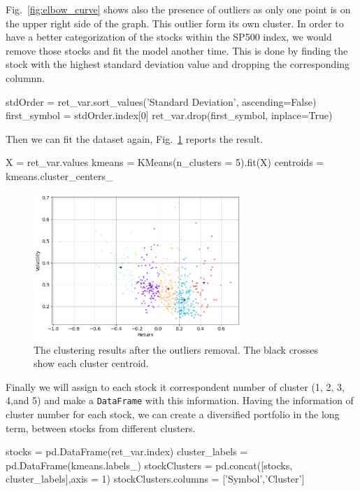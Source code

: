 Fig.~\ref{fig:elbow_curve} shows also the presence of outliers as only one point is on the upper right side of the graph. This outlier form its own cluster. In order to have a better categorization of the stocks within the SP500 index, we would remove those stocks and fit the model another time.
This is done by finding the stock with the highest standard deviation value and dropping the corresponding columnn.
 
\begin{ipython}
stdOrder = ret_var.sort_values('Standard Deviation', ascending=False)
first_symbol = stdOrder.index[0]
ret_var.drop(first_symbol, inplace=True)
\end{ipython}
Then we can fit the dataset again, Fig.~\ref{fig:k_means_noout} reports the result.

\begin{ipython}
X = ret_var.values
kmeans = KMeans(n_clusters = 5).fit(X)
centroids = kmeans.cluster_centers_
\end{ipython}
 
\begin{figure}
\centering
\includegraphics[width=0.7\textwidth]{figures/k_means_noout}
\caption{The clustering results after the outliers removal. The black crosses show each cluster centroid.}
\label{fig:k_means_noout}
\end{figure}
  
Finally we will assign to each stock it correspondent number of cluster (1, 2, 3, 4,and 5) and make a \texttt{DataFrame} with this information. Having the information of cluster number for each stock, we can create a diversified portfolio in the long term, between stocks from different clusters.

\begin{ipython} 
stocks = pd.DataFrame(ret_var.index)
cluster_labels = pd.DataFrame(kmeans.labels_)
stockClusters = pd.concat([stocks, cluster_labels],axis = 1)
stockClusters.columns = ['Symbol','Cluster']
\end{ipython}
 
